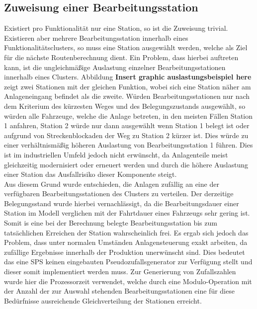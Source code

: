 		\subsection{Zuweisung einer Bearbeitungsstation}
			\label{Zuweisung_Station}
			Existiert pro Funktionalität nur eine Station, so ist die Zuweisung trivial. Existieren aber mehrere Bearbeitungsstation innerhalb eines Funktionalitätsclusters, so muss eine Station ausgewählt werden, welche als Ziel für die nächste Routenberechnung dient. Ein Problem, dass hierbei auftreten kann, ist die ungleichmäßige Auslastung einzelner Bearbeitungsstationen innerhalb eines Clusters. Abbildung \textbf{Insert graphic auslastungsbeispiel here} zeigt zwei Stationen mit der gleichen Funktion, wobei sich eine Station näher am Anlageneingang befindet als die zweite. Würden Bearbeitungsstationen nur nach dem Kriterium des kürzesten Weges und des Belegungszustands ausgewählt, so würden alle Fahrzeuge, welche die Anlage betreten, in den meisten Fällen Station 1 anfahren, Station 2 würde nur dann ausgewählt wenn Station 1 belegt ist oder aufgrund von Streckenblockaden der Weg zu Station 2 kürzer ist. Dies würde zu einer verhältnismäßig höheren Auslastung von Bearbeitungsstation 1 führen. Dies ist im industriellen Umfeld jedoch nicht erwünscht, da Anlagenteile meist gleichzeitig modernisiert oder erneuert werden und durch die höhere Auslastung einer Station das Ausfallrisiko dieser Komponente steigt.
			\\
			Aus diesem Grund wurde entschieden, die Anlagen zufällig an eine der verfügbaren Bearbeitungsstationen des Clusters zu verteilen. Der derzeitige Belegungsstand wurde hierbei vernachlässigt, da die Bearbeitungsdauer einer Station im Modell verglichen mit der Fahrtdauer eines Fahrzeugs sehr gering ist. Somit is eine bei der Berechnung belegte Bearbeitungsstation bis zum tatsächlichen Erreichen der Station wahrscheinlich frei.  Es ergab sich jedoch das Problem, dass unter normalen Umständen Anlagensteuerung exakt arbeiten, da zufällige Ergebnisse innerhalb der Produktion unerwünscht sind. Dies bedeutet das eine \ac{SPS} keinen eingebauten Pseudozufallsgenerator zur Verfügung stellt und dieser somit implementiert werden muss. Zur Generierung von Zufallszahlen wurde hier die Prozessorzeit verwendet, welche durch eine Modulo-Operation mit der Anzahl der zur Auswahl stehenden Bearbeitungsstationen eine für diese Bedürfnisse ausreichende Gleichverteilung der Stationen erreicht.
		
